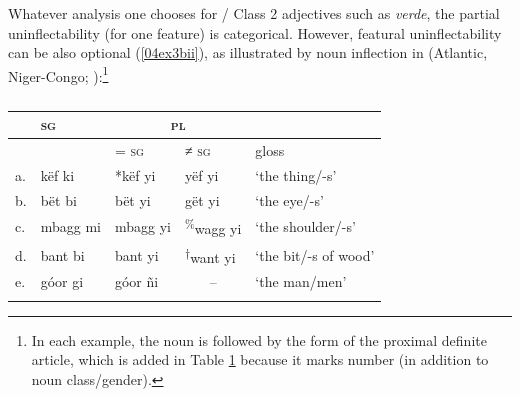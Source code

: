 \documentclass[output=paper,colorlinks,citecolor=brown]{langscibook}
\begin{document}
\bigskip

Whatever analysis one chooses for / Class 2 adjectives such as \emph{verde}, the partial uninflectability (for one feature) is categorical. However, featural uninflectability can be also optional (\ref{04ex3bii}), as illustrated by noun inflection in  (Atlantic, Niger-Congo; \citealt[10]{babouloporcaro2016}):\footnote{In each example, the noun is followed by the form of the proximal definite article, which is added in Table \ref{04tab8} because it marks number (in addition to noun class/gender).}

\begin{table}[ht]
	\centering
	\caption{}
	\label{04tab8}
	\begin{tabularx}{0.77\textwidth}{lllll}
		\lsptoprule
		& \textsc{sg} & \multicolumn{2}{c}{\textsc{pl}} & \ili{Wolof} \\
		\midrule
		& & = \textsc{sg} & \textsc{≠ sg} & gloss \\
		\midrule
		a. & këf ki & *këf yi & yëf yi & ‘the thing/-s’ \\
		b. & bët bi & bët yi & gët yi & ‘the eye/-s’ \\
		c. & mbagg mi & mbagg yi & \textsuperscript{\%}wagg yi & ‘the shoulder/-s’ \\
		d. & bant bi & bant yi & \textsuperscript{†}want yi & ‘the bit/-s of wood’ \\
		e. & góor gi & góor ñi & \multicolumn{1}{c}{--} & ‘the man/men’ \\
		\lspbottomrule
	\end{tabularx}
\end{table}
\end{document}
